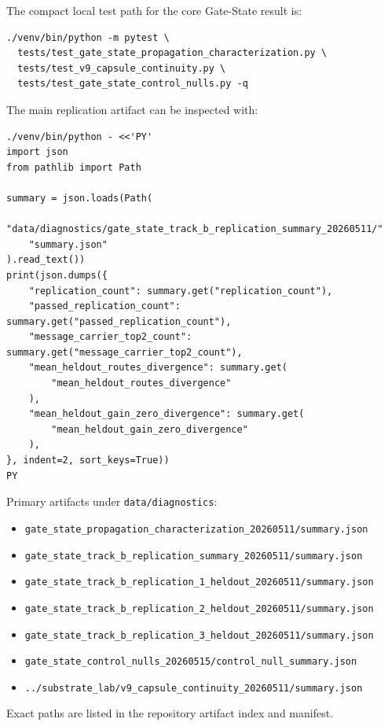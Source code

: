 \documentclass[11pt]{article}
\begin{document}
The compact local test path for the core Gate-State result is:

\begin{verbatim}
./venv/bin/python -m pytest \
  tests/test_gate_state_propagation_characterization.py \
  tests/test_v9_capsule_continuity.py \
  tests/test_gate_state_control_nulls.py -q
\end{verbatim}

The main replication artifact can be inspected with:

\begin{verbatim}
./venv/bin/python - <<'PY'
import json
from pathlib import Path

summary = json.loads(Path(
    "data/diagnostics/gate_state_track_b_replication_summary_20260511/"
    "summary.json"
).read_text())
print(json.dumps({
    "replication_count": summary.get("replication_count"),
    "passed_replication_count": summary.get("passed_replication_count"),
    "message_carrier_top2_count": summary.get("message_carrier_top2_count"),
    "mean_heldout_routes_divergence": summary.get(
        "mean_heldout_routes_divergence"
    ),
    "mean_heldout_gain_zero_divergence": summary.get(
        "mean_heldout_gain_zero_divergence"
    ),
}, indent=2, sort_keys=True))
PY
\end{verbatim}

Primary artifacts under \texttt{data/diagnostics}:

\begin{itemize}
  \item \texttt{gate\_state\_propagation\_characterization\_20260511/summary.json}
  \item \texttt{gate\_state\_track\_b\_replication\_summary\_20260511/summary.json}
  \item \texttt{gate\_state\_track\_b\_replication\_1\_heldout\_20260511/summary.json}
  \item \texttt{gate\_state\_track\_b\_replication\_2\_heldout\_20260511/summary.json}
  \item \texttt{gate\_state\_track\_b\_replication\_3\_heldout\_20260511/summary.json}
  \item \texttt{gate\_state\_control\_nulls\_20260515/control\_null\_summary.json}
  \item \texttt{../substrate\_lab/v9\_capsule\_continuity\_20260511/summary.json}
\end{itemize}

Exact paths are listed in the repository artifact index and manifest.
\end{document}
